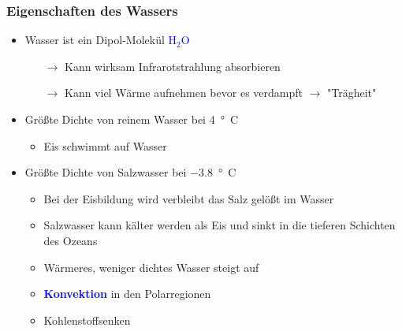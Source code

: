 \begin{frame}
	\frametitle{Eigenschaften des Wassers} %
	\begin{itemize}
		\item Wasser ist ein Dipol-Molekül \textcolor{blue}{H$_2$O}
		\begin{itemize}
			\item[$\rightarrow$] Kann wirksam Infrarotstrahlung absorbieren
			\item[$\rightarrow$] Kann viel Wärme aufnehmen bevor es verdampft $\rightarrow$ "Trägheit"
		\end{itemize}

		\item<2-> Größte Dichte von reinem Wasser bei \SI{4}{°C}
		\begin{itemize}
			\item<2->[$\rightarrow$] Eis schwimmt auf Wasser
		\end{itemize}
		\item<3->Größte Dichte von Salzwasser bei \SI{-3,8}{°C}
		\begin{itemize}
			\item<3-> [] Bei der Eisbildung wird verbleibt das Salz gelößt im Wasser
			\item<3-> [$\rightarrow$] Salzwasser kann kälter werden als Eis und sinkt in die tieferen Schichten des Ozeans
			\item<3-> [$\rightarrow$] Wärmeres, weniger dichtes Wasser steigt auf
			\item<3-> [] \textbf{\textcolor{blue}{Konvektion}} in den Polarregionen
			\item<3-> [$\rightarrow$] Kohlenstoffsenken
		\end{itemize}
	\end{itemize}


\end{frame}

